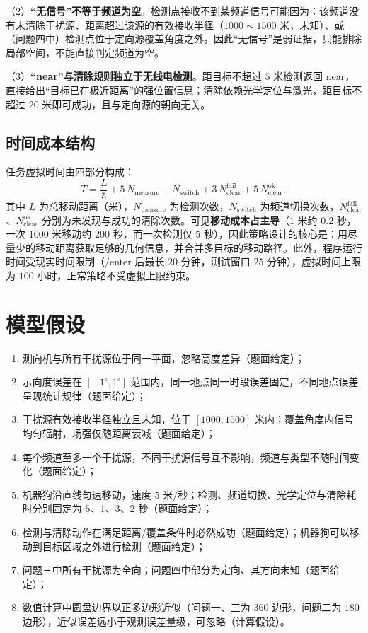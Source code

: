 \documentclass[12pt,a4paper]{ctexart}
\numberwithin{figure}{section}
\numberwithin{table}{section}
\numberwithin{equation}{section}
\begin{document}
（2）\textbf{“无信号”不等于频道为空}。检测点接收不到某频道信号可能因为：该频道没有未清除干扰源、距离超过该源的有效接收半径（$1000\sim1500$ 米，未知）、或（问题四中）检测点位于定向源覆盖角度之外。因此“无信号”是弱证据，只能排除局部空间，不能直接判定频道为空。

（3）\textbf{“near”与清除规则独立于无线电检测}。距目标不超过 $5$ 米检测返回 near，直接给出“目标已在极近距离”的强位置信息；清除依赖光学定位与激光，距目标不超过 $20$ 米即可成功，且与定向源的朝向无关。

\subsection{时间成本结构}

任务虚拟时间由四部分构成：
\begin{equation}
T = \frac{L}{5} + 5\,N_{\mathrm{measure}} + N_{\mathrm{switch}} + 3\,N_{\mathrm{clear}}^{\mathrm{fail}} + 5\,N_{\mathrm{clear}}^{\mathrm{ok}},
\label{eq:cost}
\end{equation}
其中 $L$ 为总移动距离（米），$N_{\mathrm{measure}}$ 为检测次数，$N_{\mathrm{switch}}$ 为频道切换次数，$N_{\mathrm{clear}}^{\mathrm{fail}}$、$N_{\mathrm{clear}}^{\mathrm{ok}}$ 分别为未发现与成功的清除次数。可见\textbf{移动成本占主导}（$1$ 米约 $0.2$ 秒，一次 $1000$ 米移动约 $200$ 秒，而一次检测仅 $5$ 秒），因此策略设计的核心是：用尽量少的移动距离获取足够的几何信息，并合并多目标的移动路径。此外，程序运行时间受现实时间限制（/enter 后最长 $20$ 分钟，测试窗口 $25$ 分钟），虚拟时间上限为 $100$ 小时，正常策略不受虚拟上限约束。

\section{模型假设}

\begin{enumerate}[label=\textbf{(\arabic*)}]
\item 测向机与所有干扰源位于同一平面，忽略高度差异（题面给定）；
\item 示向度误差在 $[-1^{\circ},1^{\circ}]$ 范围内，同一地点同一时段误差固定，不同地点误差呈现统计规律（题面给定）；
\item 干扰源有效接收半径独立且未知，位于 $[1000,1500]$ 米内；覆盖角度内信号均匀辐射，场强仅随距离衰减（题面给定）；
\item 每个频道至多一个干扰源，不同干扰源信号互不影响，频道与类型不随时间变化（题面给定）；
\item 机器狗沿直线匀速移动，速度 $5$ 米/秒；检测、频道切换、光学定位与清除耗时分别固定为 $5$、$1$、$3$、$2$ 秒（题面给定）；
\item 检测与清除动作在满足距离/覆盖条件时必然成功（题面给定）；机器狗可以移动到目标区域之外进行检测（题面给定）；
\item 问题三中所有干扰源为全向；问题四中部分为定向、其方向未知（题面给定）；
\item 数值计算中圆盘边界以正多边形近似（问题一、三为 $360$ 边形，问题二为 $180$ 边形），近似误差远小于观测误差量级，可忽略（计算假设）。
\end{enumerate}
\end{document}
